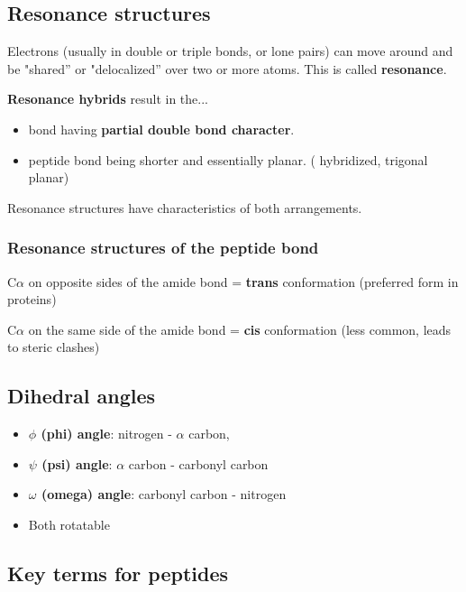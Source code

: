 \documentclass[letterpaper, 12pt]{article}
\begin{document}
\subsection*{Resonance structures}

Electrons (usually in double or triple bonds, or lone pairs) can move around
and be "shared'' or "delocalized'' over two or more atoms. This is called \textbf{resonance}.

\textbf{Resonance hybrids} result in the...

\begin{itemize}
\item {} bond having \textbf{partial double bond character}.
\item peptide bond being shorter and essentially planar. ( hybridized, trigonal planar)
\end{itemize}

Resonance structures have characteristics of both arrangements.

\subsubsection*{Resonance structures of the peptide bond}

C$\alpha$ on opposite sides of the amide bond = \textbf{trans} conformation (preferred form in proteins)

C$\alpha$ on the same side of the amide bond = \textbf{cis} conformation (less common, leads to steric clashes)

\subsection*{Dihedral angles}

\begin{itemize}
\item \textbf{$\phi$ (phi) angle}: nitrogen - $\alpha$ carbon, 
\item \textbf{$\psi$ (psi) angle}: $\alpha$ carbon - carbonyl carbon 
\item \textbf{$\omega$ (omega) angle}: carbonyl carbon - nitrogen 
\item Both rotatable
\end{itemize}

\subsection*{Key terms for peptides}
\end{document}
